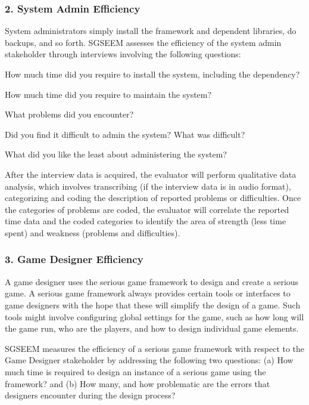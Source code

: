 \documentclass{sigchi}
\begin{document}
\subsubsection{2. System Admin Efficiency}

System administrators simply install the framework and dependent libraries, do backups,
and so forth. SGSEEM assesses the efficiency of the system admin stakeholder through
interviews involving the following questions:

\begin{compactitem}
\item How much time did you require to install the system, including the dependency?
\item How much time did you require to maintain the system?
\item What problems did you encounter?
\item Did you find it difficult to admin the system? What was difficult?
\item What did you like the least about administering the system?
\end{compactitem}

After the interview data is acquired, the evaluator will perform qualitative data
analysis, which involves transcribing (if the interview data is in audio format),
categorizing and coding the description of reported problems or difficulties.
Once the categories of problems are coded, the evaluator will correlate the reported time
data and the coded categories to identify the area of strength (less time spent) and
weakness (problems and difficulties).

\subsubsection{3. Game Designer Efficiency}

A game designer uses the serious game framework to design and create a serious game.
A serious game framework always provides certain tools or interfaces to game designers
with the hope that these will simplify the design of a game. Such tools might involve
configuring global settings for the game, such as how long will the game run, who are the
players, and how to design individual game elements.

SGSEEM measures the efficiency of a serious game framework with respect to the Game
Designer stakeholder by addressing the following two questions: (a) How much time is
required to design an instance of a serious game using the framework? and (b) How many,
and how problematic are the errors that designers encounter during the design process?
\end{document}
